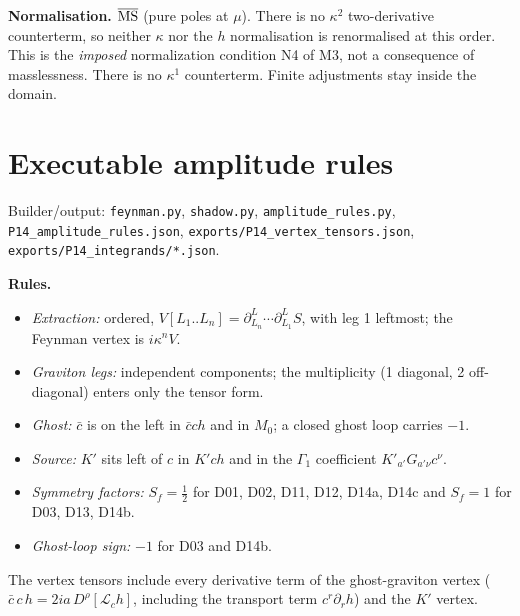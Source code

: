 \textbf{Normalisation.} $\overline{\rm MS}$ (pure poles at $\mu$). There is no $\kappa^2$ two-derivative counterterm, so
neither $\kappa$ nor the $h$ normalisation is renormalised at this order. This is the \emph{imposed} normalization
condition N4 of M3, not a consequence of masslessness. There is no $\kappa^1$ counterterm.
Finite adjustments stay inside the domain.

\section{Executable amplitude rules}\label{sec:p14-amp}
\noindent Builder/output: \texttt{feynman.py}, \texttt{shadow.py}, \texttt{amplitude\_rules.py},
\texttt{P14\_amplitude\_rules.json}, \texttt{exports/P14\_vertex\_tensors.json}, \texttt{exports/P14\_integrands/*.json}.\par\smallskip
\textbf{Rules.}
\begin{itemize}
\item \emph{Extraction:} ordered, $V[L_1..L_n]=\partial^L_{L_n}\cdots\partial^L_{L_1}S$, with leg 1 leftmost; the Feynman
vertex is $i\kappa^nV$.
\item \emph{Graviton legs:} independent components; the multiplicity (1 diagonal, 2 off-diagonal) enters only the tensor form.
\item \emph{Ghost:} $\bar c$ is on the left in $\bar cch$ and in $M_0$; a closed ghost loop carries $-1$.
\item \emph{Source:} $K'$ sits left of $c$ in $K'ch$ and in the $\Gamma_1$ coefficient $K'_{a'}G_{a'\nu}c^\nu$.
\item \emph{Symmetry factors:} $S_f=\tfrac12$ for D01, D02, D11, D12, D14a, D14c and $S_f=1$ for D03, D13, D14b.
\item \emph{Ghost-loop sign:} $-1$ for D03 and D14b.
\end{itemize}
The vertex tensors include every derivative term of the ghost-graviton vertex ($\bar c\,c\,h=2ia\,D^\rho[\mathcal L_ch]$,
including the transport term $c^r\partial_rh$) and the $K'$ vertex.

